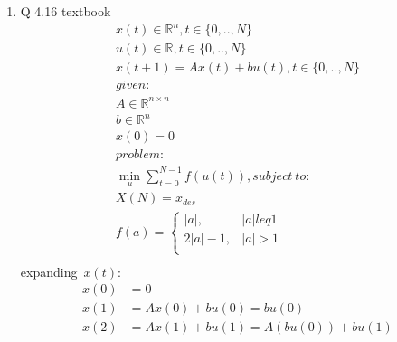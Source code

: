 \documentclass[12pt,letter]{article}
\newcommand{\R}{\mathbb{R}}
\newcommand{\norm}[1]{\|#1\|}
\begin{document}
\begin{enumerate}
    (e) Minimize $\norm{Ax-b}_1 + \norm{x}_{\infty}$
    \begin{align*}
      let\ t_i = |Ax-b|_i\\
      let\ v = max |x_i|\\
      \min_{t,v,x} \sum_i t_i + v, subject\ to:\\
      |x_i| \leq v, \forall i\\
      |Ax-b|_i \leq t_i, \forall i
    \end{align*}
    LP formulation:
    \begin{align*}
      x, t \in R^n, v \in R\\
      \min_{t,v,x} 1^T t + v, subject\ to:\\
      x_i - v \leq 0, \forall i\\
      -x_i - v \leq 0, \forall i\\
      A_{i,:}x -  t_i \leq + b_i, \forall i\\
      -A_{i,:}x - t_i \leq - b_i, \forall i\\
    \end{align*}
\pagebreak
\item Q 4.16 textbook
  \begin{align*}
    x(t) \in \R^n, t \in \{0,..,N\}\\
    u(t) \in \R, t \in \{0,..,N\}\\
    x(t+1) = Ax(t) + bu(t), t \in \{0,..,N\}\\
    given:\\
    A\in\R^{n \times n}\\
    b \in \R^n\\
    x(0) = 0\\
    problem:\\
    \min_u \sum_{t=0}^{N-1} f(u(t)), subject\ to:\\
    X(N) = x_{des}\\
    f(a) = 
    \begin{cases}
      |a|, & |a| leq 1\\
      2|a| - 1, & |a| > 1\\
    \end{cases}\\
  \end{align*}
  expanding\ $x(t)$:\\
  \begin{align*}
    x(0)&=0\\
    x(1)&=Ax(0)+bu(0) = bu(0)\\
    x(2)&=Ax(1)+bu(1)=A(bu(0))+bu(1)\\

\end{align*}
\end{enumerate}
\end{document}
